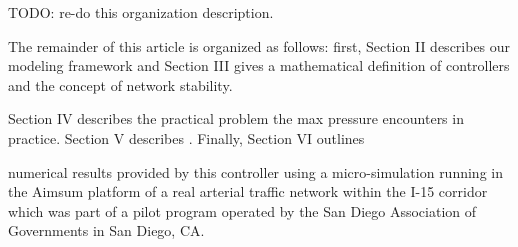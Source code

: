 
{
\color{red} TODO: re-do this organization description. 

The remainder of this article is organized as follows: first, Section II describes our modeling framework and Section III gives a mathematical definition of controllers and the concept of network stability. 

Section IV describes the practical problem the max pressure encounters in practice. Section V describes . Finally, Section VI outlines 

 numerical results provided by this controller using a micro-simulation running in the Aimsum platform of a real arterial traffic network within the I-15 corridor which was part of a pilot program operated by the San Diego Association of Governments in San Diego, CA. 
}



